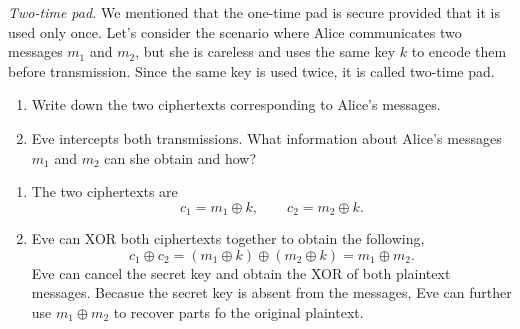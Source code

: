 \begin{exercise}
\emph{Two-time pad.} We mentioned that the one-time pad is secure provided that it is used only once. Let's consider the scenario where Alice communicates two messages $m_1$ and $m_2$, but she is careless and uses the same key $k$ to encode them before transmission. Since the same key is used twice, it is called two-time pad.
\begin{enumerate}[label=(\alph*)]
    \item Write down the two ciphertexts corresponding to Alice's messages.
    \item Eve intercepts both transmissions. What information about Alice's messages $m_1$ and $m_2$ can she obtain and how? 
\end{enumerate}
\end{exercise}
\begin{solution}
\begin{enumerate}[label=(\alph*)]
    \item The two ciphertexts are
    \begin{equation*}
        c_1 = m_1 \oplus k, \qquad c_2 = m_2 \oplus k.
    \end{equation*}
    \item Eve can XOR both ciphertexts together to obtain the following,
    \begin{equation*}
        c_1 \oplus c_2 = \left( m_1 \oplus k \right) \oplus \left( m_2 \oplus k \right) = m_1 \oplus m_2.
    \end{equation*}
    Eve can cancel the secret key and obtain the XOR of both plaintext messages. Becasue the secret key is absent from the messages, Eve can further use $m_1\oplus m_2$ to recover parts fo the original plaintext.
\end{enumerate}
\end{solution}

